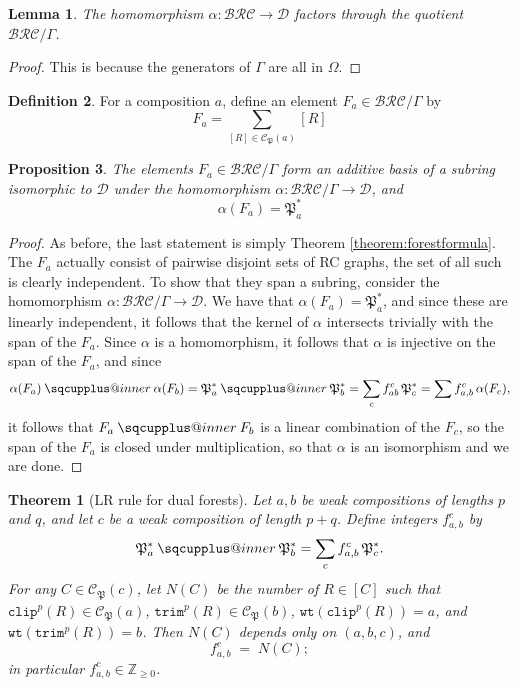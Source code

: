\documentclass{amsart}
\makeatletter
\newcommand{\sqcupplus@inner}[2]{%
  \vcenter{\hbox{\ooalign{%
    \hfil$\m@th#1\sqcup$\hfil\cr
    \hfil\raisebox{0.15ex}{$\m@th#1\scriptscriptstyle+$}\hfil\cr
  }}}%
}
\newcommand{\sqcupplus}{\mathbin{\mathpalette\sqcupplus@inner\relax}}
\newtheorem{lemma}{Lemma}[subsection]
\newtheorem{proposition}[lemma]{Proposition}
\newtheorem{theorem}{Theorem}[section]
\theoremstyle{definition}
\newtheorem{definition}[lemma]{Definition}
\theoremstyle{remark}
\numberwithin{equation}{subsection}
\newcommand{\wtt}{\mathtt{wt}}
\newcommand{\trm}{\mathtt{trim}}
\newcommand{\clp}{\mathtt{clip}}
\newcommand{\BRC}{\mathcal{BRC}}
\newcommand{\dcoma}{\mathcal{D}}
\newcommand{\forest}{\mathfrak{P}}
\makeatother
\begin{document}
\begin{lemma}
  The homomorphism $\alpha:\BRC\to\dcoma$ factors through the quotient $\BRC/\Gamma$.
\end{lemma}
\begin{proof}
This is because the generators of $\Gamma$ are all in $\Omega$.
\end{proof}

\begin{definition}
For a composition $a$, define  an element $F_a\in\BRC/\Gamma$ by
$$F_a =\sum_{[R]\in\mathcal{C}_\forest(a)} [R]$$
\end{definition}

\begin{proposition}
The elements $F_a\in\BRC/\Gamma$ form an additive basis of a subring isomorphic to $\dcoma$ under the homomorphism $\alpha:\BRC/\Gamma\to \dcoma$, and 
$$\alpha(F_a) = \forest_a^*$$
\end{proposition}
\begin{proof}
As before, the last statement is simply Theorem \ref{theorem:forestformula}. The $F_a$ actually consist of pairwise disjoint sets of RC graphs, the set of all such is clearly independent. To show that they span a subring, consider the homomorphism $\alpha:\BRC/\Gamma\to \dcoma$. We have that $\alpha(F_a)=\forest_a^*$, and since these are linearly independent, it follows that the kernel of $\alpha$ intersects trivially with the span of the $F_a$. Since $\alpha$ is a homomorphism, it follows that $\alpha$ is injective on the span of the $F_a$, and since 
$$\alpha(F_a)\sqcupplus\alpha(F_b) = \forest_a^*\sqcupplus\forest_b^*=\sum_{c}f_{ab}^c\,\forest_c^*=\sum f_{a,b}^c\,\alpha(F_c),$$ 
it follows that $F_a\sqcupplus F_b$ is a linear combination of the $F_c$, so the span of the $F_a$ is closed under multiplication, so that $\alpha$ is an isomorphism and we are done.
\end{proof}

\begin{theorem}[LR rule for dual forests]\label{theorem:LRforest}
Let $a,b$ be weak compositions of lengths $p$ and $q$, and let $c$ be a weak composition of length $p+q$. Define integers $f_{a,b}^c$ by
$$\forest_a^* \sqcupplus \forest_b^* = \sum_{c} f_{a,b}^c\,\forest_c^*.$$
For any $C\in\mathcal{C}_\forest(c)$, let $N(C)$ be the number of $R\in[C]$ such that $\clp^p(R)\in \mathcal{C}_\forest(a)$, $\trm^p(R)\in \mathcal{C}_\forest(b)$, $\wtt(\clp^p(R))=a$, and $\wtt(\trm^p(R))=b$. Then $N(C)$ depends only on $(a,b,c)$, and
$$f_{a,b}^c \;=\; N(C);$$
in particular $f_{a,b}^c\in\mathbb{Z}_{\geq 0}$.
\end{theorem}
\end{document}
